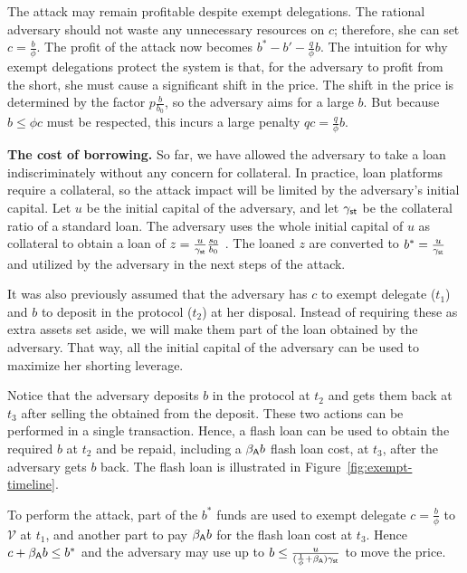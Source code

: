 The attack may remain profitable despite exempt delegations.
The rational adversary should not waste any unnecessary resources on
$c$; therefore, she can set $c = \frac{b}{\phi}$. The profit of the attack now
becomes $b^* - b' - \frac{q}{\phi}b$.
The intuition for why exempt delegations protect the system is that,
for the adversary to profit from the short, she must cause a significant
shift in the price. The shift in the price is determined by the factor
$p\frac{b}{b_0}$, so the adversary aims for a large $b$. But because $b \leq \phi c$
must be respected, this incurs a large penalty $qc = \frac{q}{\phi}b$.

\noindent
\textbf{The cost of borrowing.}
So far, we have allowed the adversary to take a loan indiscriminately without
any concern for collateral. In practice, loan platforms
require a collateral, so the attack impact will be limited by the adversary's
initial capital. Let $u$ \asset be the initial capital of the adversary, and
let $\gamma_{\textsf{st}}$ be the collateral ratio of a standard \stasset
loan. The adversary uses the whole initial capital of $u$ \asset as
collateral to obtain a loan of $z = \frac{u}{\gamma_{\textsf{st}}} \frac{s_0}{b_0}$ \stasset.
The loaned $z$ \stasset are converted to $b^*=\frac{u}{\gamma_{\textsf{st}}}$ \asset
and utilized by the adversary in the next steps of the attack.

It was also previously assumed that the adversary has $c$ \asset to exempt
delegate ($t_1$) and $b$ \asset to deposit in the protocol ($t_2$) at her disposal.
Instead of requiring these as extra assets set aside, we will make them part of
the loan obtained by the adversary. That way, all the initial capital of
the adversary can be used to maximize her shorting leverage.

Notice that the adversary deposits $b$ \asset in the protocol at $t_2$ and
gets them back at $t_3$ after selling the \stasset obtained from the deposit.
These two actions can be performed in a single transaction. Hence, a flash
loan can be used to obtain the required $b$ \asset at $t_2$ and be repaid,
including a $\beta_{\textsf{A}} b$ \asset flash loan cost, at $t_3$, after the adversary gets
$b$ \asset back.
The flash loan is illustrated in Figure~\ref{fig:exempt-timeline}.

To perform the attack, part of the $b^*$ funds are used to exempt delegate
$c = \frac{b}{\phi}$ \asset to $\mathcal{V}$ at $t_1$, and another part
to pay $\beta_{\textsf{A}} b$ \asset for the flash loan cost at $t_3$.
Hence $c + \beta_{\textsf{A}} b \leq b^*$ and the adversary may use up to
$b \leq \frac{u}{(\frac{1}{\phi} + \beta_{\textsf{A}})\gamma_{\textsf{st}}}$
to move the price.

